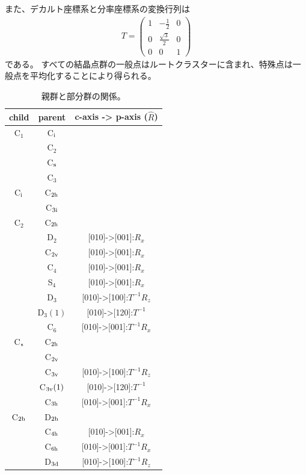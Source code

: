 \documentclass[11pt]{easymemo}
\begin{document}
また、デカルト座標系と分率座標系の変換行列は
\begin{align}
T = \begin{pmatrix} 1 & -\frac{1}{2} & 0 \\ 0 & \frac{\sqrt{3}}{2} & 0 \\ 0 & 0 & 1 \end{pmatrix}
\end{align}
である。
すべての結晶点群の一般点はルートクラスターに含まれ、特殊点は一般点を平均化することにより得られる。

\begin{table}[t]
\caption{親群と部分群の関係。}
\label{tbl:1}
\begin{center}
\scriptsize
\begin{tabular}{ccc} \hline\hline
child & parent & c-axis -> p-axis ($\hat{R}$) \\ \hline
C$_1$ & C$_{\rm i}$ & \\
   & C$_2$ & \\
   & C$_{\rm s}$ & \\
   & C$_3$ & \\ \hline
C$_{\rm i}$ & C$_{\rm 2h}$ & \\
   & C$_{\rm 3i}$ & \\ \hline\hline
C$_2$ & C$_{\rm 2h}$ & \\
   & D$_2$ & [010]->[001]:$R_x$ \\
   & C$_{\rm 2v}$ & [010]->[001]:$R_x$ \\
   & C$_4$ & [010]->[001]:$R_x$ \\
   & S$_4$ & [010]->[001]:$R_x$ \\
   & D$_3$ & [010]->[100]:$T^{-1}R_z$ \\
   & D$_3(1)$ & [010]->[120]:$T^{-1}$ \\
   & C$_6$ & [010]->[001]:$T^{-1}R_x$ \\ \hline
C$_{\rm s}$ & C$_{\rm 2h}$ & \\
   & C$_{\rm 2v}$ & \\
   & C$_{\rm 3v}$ & [010]->[100]:$T^{-1}R_z$ \\
   & C$_{\rm 3v}(1)$ & [010]->[120]:$T^{-1}$ \\
   & C$_{\rm 3h}$ & [010]->[001]:$T^{-1}R_x$ \\ \hline
C$_{\rm 2h}$ & D$_{\rm 2h}$ & \\
   & C$_{\rm 4h}$ & [010]->[001]:$R_x$ \\
   & C$_{\rm 6h}$ & [010]->[001]:$T^{-1}R_x$ \\
   & D$_{\rm 3d}$ & [010]->[100]:$T^{-1}R_z$ \\

\end{tabular}
\end{center}
\end{table}
\end{document}
